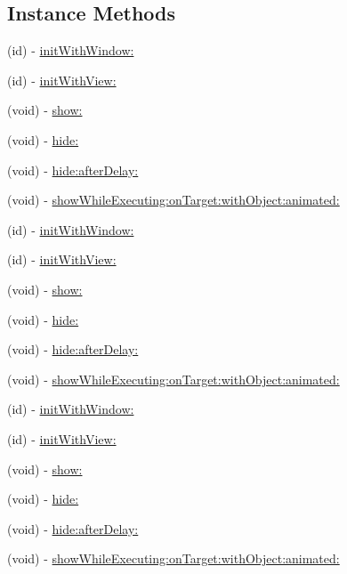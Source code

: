 \subsection*{Instance Methods}
\begin{DoxyCompactItemize}
\item 
(id) -\/ \mbox{\hyperlink{interface_m_b_progress_h_u_d_a8f3c01167d59153c85ae7efdca7717fc}{init\+With\+Window\+:}}
\item 
(id) -\/ \mbox{\hyperlink{interface_m_b_progress_h_u_d_ae42ee0d2d0ea58fac1ce8de6b5ea3b60}{init\+With\+View\+:}}
\item 
(void) -\/ \mbox{\hyperlink{interface_m_b_progress_h_u_d_a3ef075a3be624c2f94629d63bfeae25b}{show\+:}}
\item 
(void) -\/ \mbox{\hyperlink{interface_m_b_progress_h_u_d_a500fd79859e56cf98fd2eebfd37b4204}{hide\+:}}
\item 
(void) -\/ \mbox{\hyperlink{interface_m_b_progress_h_u_d_a4181ac00f5f1ef95bcfab6749e1642e6}{hide\+:after\+Delay\+:}}
\item 
(void) -\/ \mbox{\hyperlink{interface_m_b_progress_h_u_d_abe8cfd9eee14280d49925dbc8188dc48}{show\+While\+Executing\+:on\+Target\+:with\+Object\+:animated\+:}}
\item 
(id) -\/ \mbox{\hyperlink{interface_m_b_progress_h_u_d_a8f3c01167d59153c85ae7efdca7717fc}{init\+With\+Window\+:}}
\item 
(id) -\/ \mbox{\hyperlink{interface_m_b_progress_h_u_d_ae42ee0d2d0ea58fac1ce8de6b5ea3b60}{init\+With\+View\+:}}
\item 
(void) -\/ \mbox{\hyperlink{interface_m_b_progress_h_u_d_a3ef075a3be624c2f94629d63bfeae25b}{show\+:}}
\item 
(void) -\/ \mbox{\hyperlink{interface_m_b_progress_h_u_d_a500fd79859e56cf98fd2eebfd37b4204}{hide\+:}}
\item 
(void) -\/ \mbox{\hyperlink{interface_m_b_progress_h_u_d_a4181ac00f5f1ef95bcfab6749e1642e6}{hide\+:after\+Delay\+:}}
\item 
(void) -\/ \mbox{\hyperlink{interface_m_b_progress_h_u_d_abe8cfd9eee14280d49925dbc8188dc48}{show\+While\+Executing\+:on\+Target\+:with\+Object\+:animated\+:}}
\item 
(id) -\/ \mbox{\hyperlink{interface_m_b_progress_h_u_d_a8f3c01167d59153c85ae7efdca7717fc}{init\+With\+Window\+:}}
\item 
(id) -\/ \mbox{\hyperlink{interface_m_b_progress_h_u_d_ae42ee0d2d0ea58fac1ce8de6b5ea3b60}{init\+With\+View\+:}}
\item 
(void) -\/ \mbox{\hyperlink{interface_m_b_progress_h_u_d_a3ef075a3be624c2f94629d63bfeae25b}{show\+:}}
\item 
(void) -\/ \mbox{\hyperlink{interface_m_b_progress_h_u_d_a500fd79859e56cf98fd2eebfd37b4204}{hide\+:}}
\item 
(void) -\/ \mbox{\hyperlink{interface_m_b_progress_h_u_d_a4181ac00f5f1ef95bcfab6749e1642e6}{hide\+:after\+Delay\+:}}
\item 
(void) -\/ \mbox{\hyperlink{interface_m_b_progress_h_u_d_abe8cfd9eee14280d49925dbc8188dc48}{show\+While\+Executing\+:on\+Target\+:with\+Object\+:animated\+:}}
\end{DoxyCompactItemize}
